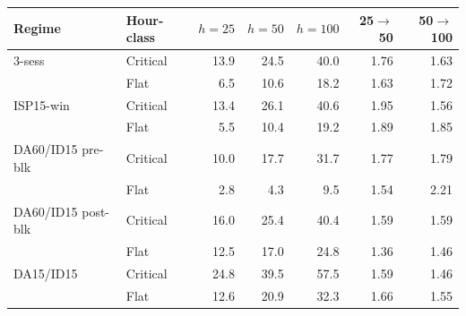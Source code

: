 \begin{tabular}{l l r r r r r}
\toprule
Regime & Hour-class & $h = 25$ & $h = 50$ & $h = 100$ & 25$\to$50 & 50$\to$100 \\
\midrule
3-sess & Critical & 13.9 & 24.5 & 40.0 & 1.76 & 1.63 \\
 & Flat & 6.5 & 10.6 & 18.2 & 1.63 & 1.72 \\
ISP15-win & Critical & 13.4 & 26.1 & 40.6 & 1.95 & 1.56 \\
 & Flat & 5.5 & 10.4 & 19.2 & 1.89 & 1.85 \\
DA60/ID15 pre-blk & Critical & 10.0 & 17.7 & 31.7 & 1.77 & 1.79 \\
 & Flat & 2.8 & 4.3 & 9.5 & 1.54 & 2.21 \\
DA60/ID15 post-blk & Critical & 16.0 & 25.4 & 40.4 & 1.59 & 1.59 \\
 & Flat & 12.5 & 17.0 & 24.8 & 1.36 & 1.46 \\
DA15/ID15 & Critical & 24.8 & 39.5 & 57.5 & 1.59 & 1.46 \\
 & Flat & 12.6 & 20.9 & 32.3 & 1.66 & 1.55 \\
\bottomrule
\end{tabular}